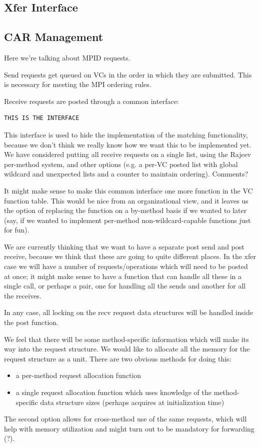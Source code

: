 \documentclass[11pt,letterpaper]{article}
\begin{document}
%
%
\subsection{Xfer Interface}


\subsection{CAR Management}

Here we're talking about MPID requests.

Send requests get queued on VCs in the order in which they are submitted.  This
is necessary for meeting the MPI ordering rules.

Receive requests are posted through a common interface:
\begin{verbatim}
THIS IS THE INTERFACE
\end{verbatim}
This interface is used to hide the implementation of the matching
functionality, because we don't think we really know how we want this to be
implemented yet.  We have considered putting all receive requests on a single
list, using the Rajeev per-method system, and other options (e.g. a per-VC
posted list with global wildcard and unexpected lists and a counter to
maintain ordering).  Comments?

It might make sense to make this common interface one more function in the VC
function table.  This would be nice from an organizational view, and it leaves
us the option of replacing the function on a by-method basis if we wanted to
later (say, if we wanted to implement per-method non-wildcard-capable functions
just for fun).

We are currently thinking that we want to have a separate post send and post
receive, because we think that these are going to quite different places.  In
the xfer case we will have a number of requests/operations which will need to
be posted at once; it might make sense to have a function that can handle all
these in a single call, or perhaps a pair, one for handling all the sends and
another for all the receives.

In any case, all locking on the recv request data structures will be handled
inside the post function.

We feel that there will be some method-specific information which will make its
way into the request structure.  We would like to allocate all the memory for the request structure as a unit.  There are two obvious methods for doing this:
\begin{itemize}
\item a per-method request allocation function
\item a single request allocation function which uses knowledge of the
  method-specific data structure sizes (perhaps acquires at initialization
  time)
\end{itemize}
The second option allows for cross-method use of the same requests, which will
help with memory utilization and might turn out to be mandatory for forwarding
(?).
\end{document}
